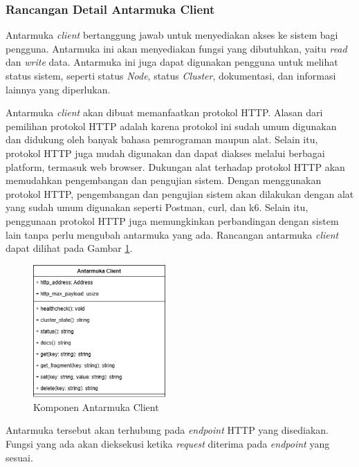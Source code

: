 \subsubsection{Rancangan Detail Antarmuka Client}
\label{subsubsection:detail-client-interface}

Antarmuka \textit{client} bertanggung jawab untuk menyediakan akses ke sistem bagi pengguna. Antarmuka ini akan menyediakan fungsi yang dibutuhkan, yaitu \textit{read} dan \textit{write} data. Antarmuka ini juga dapat digunakan pengguna untuk melihat status sistem, seperti status \textit{Node}, status \textit{Cluster}, dokumentasi, dan informasi lainnya yang diperlukan.

Antarmuka \textit{client} akan dibuat memanfaatkan protokol HTTP. Alasan dari pemilihan protokol HTTP adalah karena protokol ini sudah umum digunakan dan didukung oleh banyak bahasa pemrograman maupun alat. Selain itu, protokol HTTP juga mudah digunakan dan dapat diakses melalui berbagai platform, termasuk web browser. Dukungan alat terhadap protokol HTTP akan memudahkan pengembangan dan pengujian sistem. Dengan menggunakan protokol HTTP, pengembangan dan pengujian sistem akan dilakukan dengan alat yang sudah umum digunakan seperti Postman, curl, dan k6. Selain itu, penggunaan protokol HTTP juga memungkinkan perbandingan dengan sistem lain tanpa perlu mengubah antarmuka yang ada. Rancangan antarmuka \textit{client} dapat dilihat pada Gambar \ref{fig:client-interface-component}.

\begin{figure}[ht]
    \centering
    \includegraphics[width=0.45\textwidth]{resources/chapter-3/client-interface-component.png}
    \caption{Komponen Antarmuka Client}
    \label{fig:client-interface-component}
\end{figure}

Antarmuka tersebut akan terhubung pada \textit{endpoint} HTTP yang disediakan. Fungsi yang ada akan dieksekusi ketika \textit{request} diterima pada \textit{endpoint} yang sesuai.